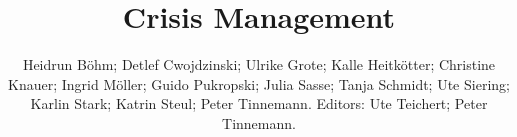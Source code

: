 \documentclass[11pt]{book}
\title{Crisis Management}
\author{Heidrun Böhm; Detlef Cwojdzinski; Ulrike Grote; Kalle Heitkötter; Christine Knauer; Ingrid Möller; Guido Pukropski; Julia Sasse; Tanja Schmidt; Ute Siering; Karlin Stark; Katrin Steul; Peter Tinnemann. Editors: Ute Teichert; Peter Tinnemann.}
\begin{document}
\maketitle
\def\title#1{\chapter{#1}}
\tableofcontents

        
        
        
        
        
        
        
        
        
        
        
        
        
        
        
        
        
        
        
        
        
        
        
        
        
        
        
        
        
        
        
        
        
        
        
        
\end{document}
